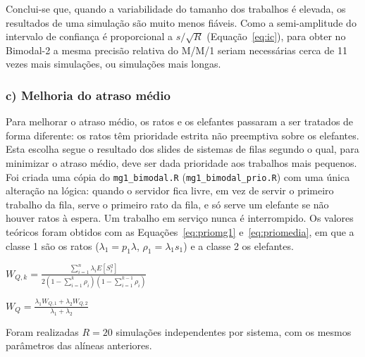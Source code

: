 \documentclass[10pt,a4paper]{article}
\newcommand{\formula}[3]{\begin{equacao}[H]\centering$\displaystyle #1$\caption{#2}\label{#3}\end{equacao}}
\begin{document}
Conclui-se que, quando a variabilidade do tamanho dos trabalhos é elevada, os resultados de uma simulação são muito menos fiáveis. Como a semi-amplitude do intervalo de confiança é proporcional a $s/\sqrt{R}$ (Equação~\ref{eq:ic}), para obter no Bimodal-2 a mesma precisão relativa do M/M/1 seriam necessárias cerca de 11 vezes mais simulações, ou simulações mais longas.

\subsubsection*{c) Melhoria do atraso médio}

Para melhorar o atraso médio, os ratos e os elefantes passaram a ser tratados de forma diferente: os ratos têm prioridade estrita não preemptiva sobre os elefantes. Esta escolha segue o resultado dos slides de sistemas de filas segundo o qual, para minimizar o atraso médio, deve ser dada prioridade aos trabalhos mais pequenos. Foi criada uma cópia do \texttt{mg1\_bimodal.R} (\texttt{mg1\_bimodal\_prio.R}) com uma única alteração na lógica: quando o servidor fica livre, em vez de servir o primeiro trabalho da fila, serve o primeiro rato da fila, e só serve um elefante se não houver ratos à espera. Um trabalho em serviço nunca é interrompido. Os valores teóricos foram obtidos com as Equações~\ref{eq:priomg1} e~\ref{eq:priomedia}, em que a classe 1 são os ratos ($\lambda_1=p_1\lambda$, $\rho_1=\lambda_1s_1$) e a classe 2 os elefantes.

\formula{W_{Q,k}=\frac{\sum_{i=1}^{n}\lambda_iE[S_i^2]}{2\left(1-\sum_{i=1}^{k}\rho_i\right)\left(1-\sum_{i=1}^{k-1}\rho_i\right)}}{Atraso médio na fila da classe $k$ num M/G/1 com prioridades estritas não preemptivas.}{eq:priomg1}

\formula{W_Q=\frac{\lambda_1W_{Q,1}+\lambda_2W_{Q,2}}{\lambda_1+\lambda_2}}{Atraso médio na fila global com duas classes.}{eq:priomedia}

Foram realizadas $R=20$ simulações independentes por sistema, com os mesmos parâmetros das alíneas anteriores.
\end{document}
